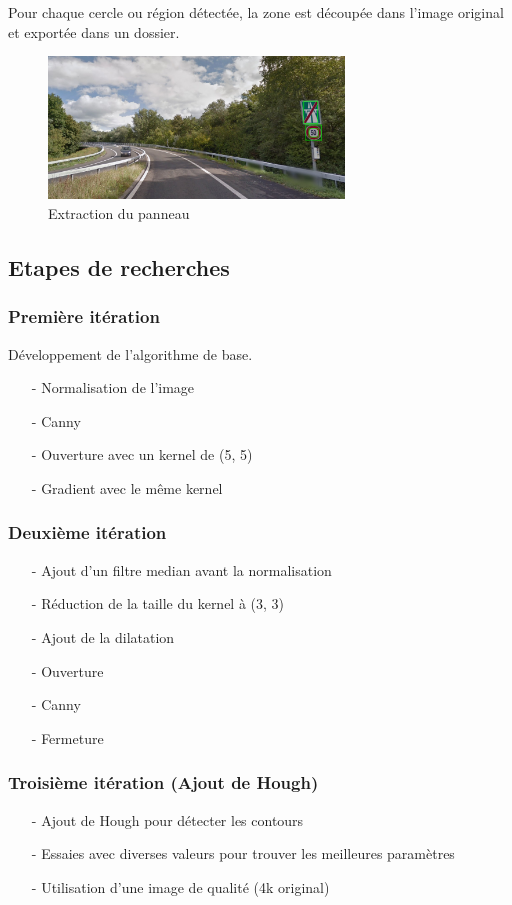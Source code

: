 \documentclass[a4paper,10pt,openany,oneside]{report}
\begin{document}
Pour chaque cercle ou région détectée, la zone est découpée dans l'image original et exportée dans un dossier.
\begin{figure}[!h]
\centering
\includegraphics[width=0.7\textwidth]{../img/10-contour.png}
\caption{Extraction du panneau}
\end{figure}

\subsection{Etapes de recherches}
\subsubsection{Première itération}
Développement de l'algorithme de base. 
\begin{itemize}
\item[-] Normalisation de l'image
\item[-] Canny
\item[-] Ouverture avec un kernel de (5, 5)
\item[-] Gradient avec le même kernel
\end{itemize}

\subsubsection{Deuxième itération}
\begin{itemize}
\item[-] Ajout d'un filtre median avant la normalisation
\item[-] Réduction de la taille du kernel à (3, 3)
\item[-] Ajout de la dilatation
\item[-] Ouverture
\item[-] Canny
\item[-] Fermeture
\end{itemize}

\subsubsection{Troisième itération (Ajout de Hough)}
\begin{itemize}
\item[-] Ajout de Hough pour détecter les contours
\item[-] Essaies avec diverses valeurs pour trouver les meilleures paramètres
\item[-] Utilisation d'une image de qualité (4k original)
\end{itemize}
\end{document}
